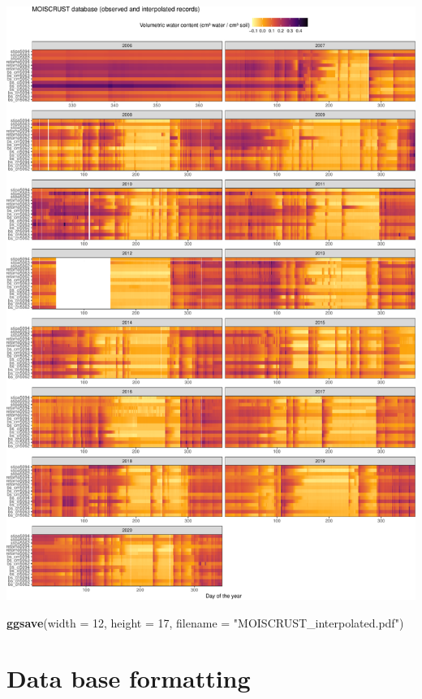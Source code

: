 \documentclass[]{article}
\newenvironment{Shaded}{\begin{snugshade}}{\end{snugshade}}
\newcommand{\DataTypeTok}[1]{\textcolor[rgb]{0.13,0.29,0.53}{#1}}
\newcommand{\DecValTok}[1]{\textcolor[rgb]{0.00,0.00,0.81}{#1}}
\newcommand{\KeywordTok}[1]{\textcolor[rgb]{0.13,0.29,0.53}{\textbf{#1}}}
\newcommand{\NormalTok}[1]{#1}
\newcommand{\StringTok}[1]{\textcolor[rgb]{0.31,0.60,0.02}{#1}}
\begin{document}
\includegraphics{moiscrust_files/figure-latex/unnamed-chunk-24-1.pdf}

\begin{Shaded}
\begin{Highlighting}[]
\KeywordTok{ggsave}\NormalTok{(}\DataTypeTok{width =} \DecValTok{12}\NormalTok{, }\DataTypeTok{height =} \DecValTok{17}\NormalTok{, }\DataTypeTok{filename =} \StringTok{"MOISCRUST_interpolated.pdf"}\NormalTok{)}
\end{Highlighting}
\end{Shaded}

\hypertarget{data-base-formatting}{%
\section{Data base formatting}\label{data-base-formatting}}
\end{document}
